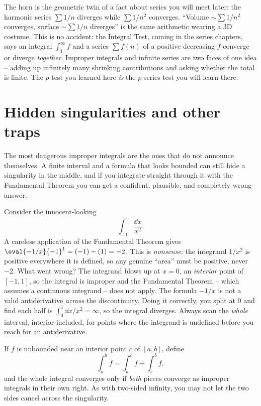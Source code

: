 \begin{connectionbox}
The horn is the geometric twin of a fact about series you will meet later: the
harmonic series $\sum 1/n$ diverges while $\sum 1/n^2$ converges. ``Volume $\sim
\sum 1/n^2$ converges, surface $\sim \sum 1/n$ diverges'' is the same arithmetic
wearing a 3D costume. This is no accident: the Integral Test, coming in the series
chapters, says an integral $\int_1^\infty f$ and a series $\sum f(n)$ of a
positive decreasing $f$ converge or diverge \emph{together}. Improper integrals
and infinite series are two faces of one idea -- adding up infinitely many shrinking
contributions and asking whether the total is finite. The $p$-test you learned
here \emph{is} the $p$-series test you will learn there.
\end{connectionbox}

\section{Hidden singularities and other traps}
\label{ch25:hidden}

The most dangerous improper integrals are the ones that do not announce themselves.
A finite interval and a formula that looks bounded can still hide a singularity in
the middle, and if you integrate straight through it with the Fundamental Theorem
you can get a confident, plausible, and completely wrong answer.

\begin{trapbox}
Consider the innocent-looking
\[
  \int_{-1}^{1} \frac{\dd x}{x^2}.
\]
A careless application of the Fundamental Theorem gives
$\eval{-1/x}{-1}^{1} = (-1) - (1) = -2$. This is \emph{nonsense}: the integrand
$1/x^2$ is positive everywhere it is defined, so any genuine ``area'' must be
positive, never $-2$. What went wrong? The integrand blows up at $x=0$, an
\emph{interior} point of $[-1,1]$, so the integral is improper and the
Fundamental Theorem -- which assumes a continuous integrand -- does not apply. The
formula $-1/x$ is not a valid antiderivative \emph{across} the discontinuity. Doing
it correctly, you split at $0$ and find each half is $\int_0^1 \dd x/x^2 = \infty$,
so the integral diverges. Always scan the \emph{whole} interval, interior included,
for points where the integrand is undefined before you reach for an antiderivative.
\end{trapbox}

\begin{definition}
\label{ch25:def-interior}
If $f$ is unbounded near an interior point $c$ of $[a,b]$, define
\[
  \int_a^{b} f = \int_a^{c} f + \int_c^{b} f,
\]
and the whole integral converges only if \emph{both} pieces converge as improper
integrals in their own right. As with two-sided infinity, you may not let the two
sides cancel across the singularity.
\end{definition}

